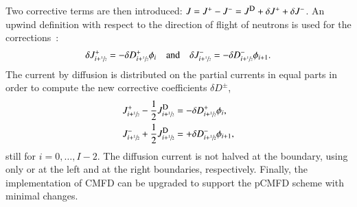 Two corrective terms are then introduced: $J = \jp - \jm = \jD + \delta J^+ + \delta J^-$. An upwind definition with respect to the direction of flight of neutrons is used for the corrections~\cite{Jarrett-2016,Zhu-2016}:
\begin{equation}
  \label{eq:CCF-sub}
  \delta J^+ _{i+\sfrac{1}{2}} = -\delta D^+ _{i+\sfrac{1}{2}} \phi_i
  \quad \text{and} \quad
  \delta J^- _{i+\sfrac{1}{2}} = -\delta D^- _{i+\sfrac{1}{2}} \phi_{i+1}.
\end{equation}
The current by diffusion is distributed on the partial currents in equal parts in order to compute the new corrective coefficients $\delta D^{\pm}$,
\begin{subequations}
  \label{eq:delta-D-pCMFD}
  \begin{align}
    J^+_{i+\hzi} - \frac{1}{2}\jD_{i+\hzi} &= -\delta D^+_{i+\hzi} \phi_i, \label{eq:delta-D-pCMFDp}\\
    J^-_{i+\hzi} + \frac{1}{2}\jD_{i+\hzi} &= +\delta D^-_{i+\hzi} \phi_{i+1}, \label{eq:delta-D-pCMFDm}
  \end{align}
\end{subequations}
still for $i=0, \ldots, I-2$. The diffusion current is not halved at the boundary, using only  or  at the left and at the right boundaries, respectively. Finally, the implementation of CMFD can be upgraded to support the pCMFD scheme with minimal changes.
%
%

